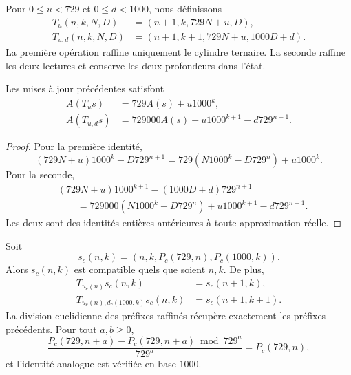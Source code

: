 \begin{definition}
Pour \(0\leq u<729\) et \(0\leq d<1000\), nous définissons
\begin{align*}
 T_u(n,k,N,D)&=(n+1,k,729N+u,D),\\
 T_{u,d}(n,k,N,D)&=(n+1,k+1,729N+u,1000D+d).
\end{align*}
La première opération raffine uniquement le cylindre ternaire. La seconde  
raffine les deux lectures et conserve les deux profondeurs dans l'état.
\end{definition}

\begin{proposition}
\label{act21:prop:df-rec-frontera}
Les mises à jour précédentes satisfont
\begin{align}
 A(T_u s)&=729A(s)+u1000^k,\label{act21:eq:df-rec-ternaria}\\
 A(T_{u,d}s)&=729000A(s)+u1000^{k+1}-d729^{n+1}.
 \label{act21:eq:df-rec-conjunta}
\end{align}
\end{proposition}

\begin{proof}
Pour la première identité,
\[
 (729N+u)1000^k-D729^{n+1}
 =729(N1000^k-D729^n)+u1000^k.
\]
Pour la seconde,
\begin{align*}
 &(729N+u)1000^{k+1}-(1000D+d)729^{n+1}\\
 &\qquad=729000(N1000^k-D729^n)
      +u1000^{k+1}-d729^{n+1}.
\end{align*}
Les deux sont des identités entières antérieures à toute approximation réelle.
\end{proof}

\begin{theorem}
\label{act21:thm:df-refinamiento-generado}
Soit
\[
 s_c(n,k)=(n,k,P_c(729,n),P_c(1000,k)).
\]
Alors \(s_c(n,k)\) est compatible quels que soient \(n,k\). De plus,
\begin{align*}
 T_{u_c(n)}s_c(n,k)&=s_c(n+1,k),\\
 T_{u_c(n),d_c(1000,k)}s_c(n,k)&=s_c(n+1,k+1).
\end{align*}
La division euclidienne des préfixes raffinés récupère exactement les
préfixes précédents. Pour tout \(a,b\geq0\),
\[
 \frac{P_c(729,n+a)-P_c(729,n+a)\bmod729^a}{729^a}
 =P_c(729,n),
\]
et l'identité analogue est vérifiée en base \(1000\).
\end{theorem}

